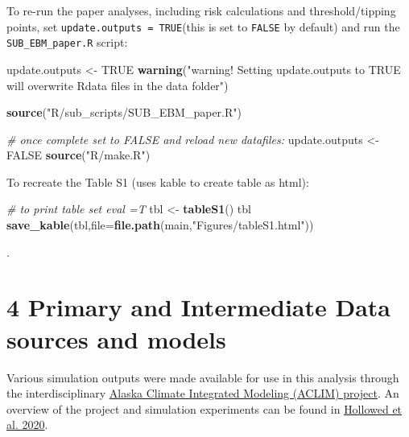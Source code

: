 \documentclass[]{article}
\newenvironment{Shaded}{\begin{snugshade}}{\end{snugshade}}
\newcommand{\KeywordTok}[1]{\textcolor[rgb]{0.13,0.29,0.53}{\textbf{{#1}}}}
\newcommand{\DataTypeTok}[1]{\textcolor[rgb]{0.13,0.29,0.53}{{#1}}}
\newcommand{\StringTok}[1]{\textcolor[rgb]{0.31,0.60,0.02}{{#1}}}
\newcommand{\CommentTok}[1]{\textcolor[rgb]{0.56,0.35,0.01}{\textit{{#1}}}}
\newcommand{\OtherTok}[1]{\textcolor[rgb]{0.56,0.35,0.01}{{#1}}}
\newcommand{\NormalTok}[1]{{#1}}
\begin{document}
To re-run the paper analyses, including risk calculations and
threshold/tipping points, set \texttt{update.outputs\ =\ TRUE}(this is
set to \texttt{FALSE} by default) and run the \texttt{SUB\_EBM\_paper.R}
script:

\begin{Shaded}
\begin{Highlighting}[]
    \NormalTok{update.outputs  <-}\StringTok{ }\OtherTok{TRUE}  
    \KeywordTok{warning}\NormalTok{(}\StringTok{"warning! Setting update.outputs to TRUE will overwrite Rdata files in the data folder"}\NormalTok{)}

    \KeywordTok{source}\NormalTok{(}\StringTok{"R/sub_scripts/SUB_EBM_paper.R"}\NormalTok{)}

    \CommentTok{# once complete set to FALSE and reload new datafiles:}
    \NormalTok{update.outputs  <-}\StringTok{ }\OtherTok{FALSE}  
    \KeywordTok{source}\NormalTok{(}\StringTok{"R/make.R"}\NormalTok{)}
\end{Highlighting}
\end{Shaded}

To recreate the Table S1 (uses kable to create table as html):

\begin{Shaded}
\begin{Highlighting}[]
    \CommentTok{# to print table set eval =T}
    \NormalTok{tbl <-}\StringTok{ }\KeywordTok{tableS1}\NormalTok{()}
    \NormalTok{tbl}
    \KeywordTok{save_kable}\NormalTok{(tbl,}\DataTypeTok{file=}\KeywordTok{file.path}\NormalTok{(main,}\StringTok{"Figures/tableS1.html"}\NormalTok{))}
\end{Highlighting}
\end{Shaded}

.

\section{4 Primary and Intermediate Data sources and
models}\label{primary-and-intermediate-data-sources-and-models}

Various simulation outputs were made available for use in this analysis
through the interdisciplinary
\href{\%22https://www.fisheries.noaa.gov/alaska/ecosystems/alaska-climate-integrated-modeling-project\%22}{Alaska
Climate Integrated Modeling (ACLIM) project}. An overview of the project
and simulation experiments can be found in
\href{\%22https://www.frontiersin.org/articles/10.3389/fmars.2019.00775/full\%22}{Hollowed
et al. 2020}.
\end{document}

